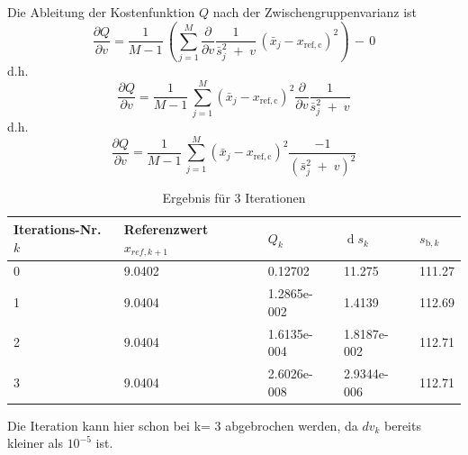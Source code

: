 Die Ableitung der Kostenfunktion $Q$ nach der Zwischengruppenvarianz ist
\begin{equation*}
\frac{\partial Q}{\partial v} = \frac{1}{M-1} \, \left( \sum\limits_{j=1}^M  
\frac{\partial }{\partial v} \frac{1}{\bar s^2_j \; + \; v} \, \left(\bar x_j - x_\mathrm{ref, c}\right)^2  \right) \, - \, 0
\end{equation*}
d.h.
\begin{equation*}
\frac{\partial Q}{\partial v} = \frac{1}{M-1} \, \sum\limits_{j=1}^M  \left(\bar x_j - x_\mathrm{ref, c}\right)^2 
\frac{\partial }{\partial v} \frac{1}{\bar s^2_j \; + \; v} 
\end{equation*}
d.h.
\begin{equation}
\frac{\partial Q}{\partial v} = \frac{1}{M-1} \, \sum\limits_{j=1}^M  \left(\bar x_j - x_\mathrm{ref, c}\right)^2 
\frac{-1}{\left(\bar s^2_j \; + \; v\right)^2} 
\end{equation}

\begin{table}[!htb]
	\caption{Ergebnis für 3 Iterationen}
	\begin{center}
		\begin{tabular}{p{2cm}| p{3.5cm} | p{3cm} |p{3cm}|p{2cm}}
			\hline 
			Iterations-Nr. $k$ & Referenzwert $x_{ref,k+1}$ & $Q_{k}$ & $\operatorname{d} s_k$ & $s_{\mathrm{b},k}$\\ \hline
			0 & 9.0402 & 0.12702 & 11.275 &  111.27\\ \hline
			1 & 9.0404 & 1.2865e-002 & 1.4139 & 112.69\\ \hline
			2 & 9.0404 & 1.6135e-004 & 1.8187e-002 & 112.71 \\ \hline
			3 & 9.0404 & 2.6026e-008 & 2.9344e-006 & 112.71 \\ \hline
		\end{tabular}
	\end{center}
	\label{tab:Iteration_von_Beispiel II}
\end{table}

Die Iteration kann hier schon bei k= 3 abgebrochen werden, da $dv_k$ bereits 
kleiner als $10^{-5}$ ist. 

